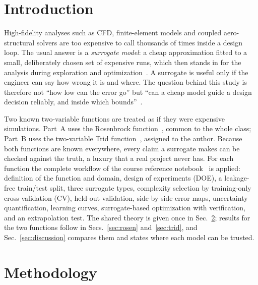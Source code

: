 
\section{Introduction}\label{sec:intro}

High-fidelity analyses such as CFD, finite-element models and coupled aero-structural solvers are too expensive to call thousands of times inside a design loop. The usual answer is a \emph{surrogate model}: a cheap approximation fitted to a small, deliberately chosen set of expensive runs, which then stands in for the analysis during exploration and optimization~\cite{queipo2005,forrester2008}. A surrogate is useful only if the engineer can say how wrong it is and where. The question behind this study is therefore not ``how low can the error go'' but ``can a cheap model guide a design decision reliably, and inside which bounds''~\cite{ae541brief}.

Two known two-variable functions are treated as if they were expensive simulations. Part~A uses the Rosenbrock function~\cite{rosenbrock1960}, common to the whole class; Part~B uses the two-variable Trid function~\cite{sfu_vlse}, assigned to the author. Because both functions are known everywhere, every claim a surrogate makes can be checked against the truth, a luxury that a real project never has. For each function the complete workflow of the course reference notebook~\cite{ae541tutorial} is applied: definition of the function and domain, design of experiments (DOE), a leakage-free train/test split, three surrogate types, complexity selection by training-only cross-validation (CV), held-out validation, side-by-side error maps, uncertainty quantification, learning curves, surrogate-based optimization with verification, and an extrapolation test. The shared theory is given once in Sec.~\ref{sec:method}; results for the two functions follow in Secs.~\ref{sec:rosen} and~\ref{sec:trid}, and Sec.~\ref{sec:discussion} compares them and states where each model can be trusted.

\section{Methodology}\label{sec:method}

